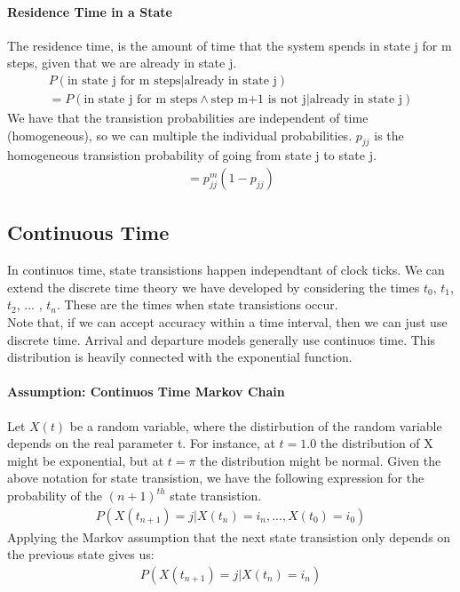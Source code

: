 \paragraph{Residence Time in a State} The residence time, is the amount of time
that the system spends in state j for m steps, given that we are already in
state j.
\begin{equation*} \begin{split}
	P( \mbox{in state j for m steps} | \mbox{already in state j}) \\
	= P( \mbox{in state j for m steps} \wedge \mbox{step m+1 is not j} | \mbox{already in state j})
\end{split} \end{equation*}
We have that the transistion probabilities are independent of time
(homogeneous), so we can multiple the individual probabilities. $p_{jj}$ is the
homogeneous transistion probability of going from state j to state j.
\begin{equation*} \begin{split}
	= p_{jj}^m(1-p_{jj})
\end{split} \end{equation*}


\subsection{Continuous Time} In continuos time, state transistions happen
independtant of clock ticks. We can extend the discrete time theory we have
developed by considering the times $t_0$, $t_1$, $t_2$, ... , $t_n$. These are the
times when state transistions occur. \\[0.5cm]

Note that, if we can accept accuracy within a time interval, then we can just
use discrete time. Arrival and departure models generally use continuos time.
This distribution is heavily connected with the exponential function. \\[0.5cm]

\paragraph{Assumption: Continuos Time Markov Chain}
Let $X(t)$ be a random variable, where the distirbution of the random variable
depends on the real parameter t.
For instance, at $t=1.0$ the distribution of X
might be exponential, but at $t=\pi$ the distribution might be normal.
Given the above notation for state transistion, we have the following expression
for the probability of the $(n+1)^{th}$ state transistion.
\begin{equation*} \begin{split}
	P(X(t_{n+1}) = j | X(t_{n}) = i_n, ... ,  X(t_{0}) = i_0)
\end{split} \end{equation*}
Applying the Markov assumption that the next state transistion only depends on
the previous state gives us:
\begin{equation*} \begin{split}
	P(X(t_{n+1}) = j | X(t_{n}) = i_n)
\end{split} \end{equation*}

